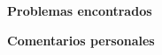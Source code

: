 \documentclass[12pt]{article}
\begin{document}

\vspace{0.2cm}

\centerline{\textbf{Problemas encontrados}}

\vspace{0.5cm}


\vspace{0.5cm}

\centerline{\textbf{Comentarios personales}}

\vspace{0.5cm}

\end{document}
